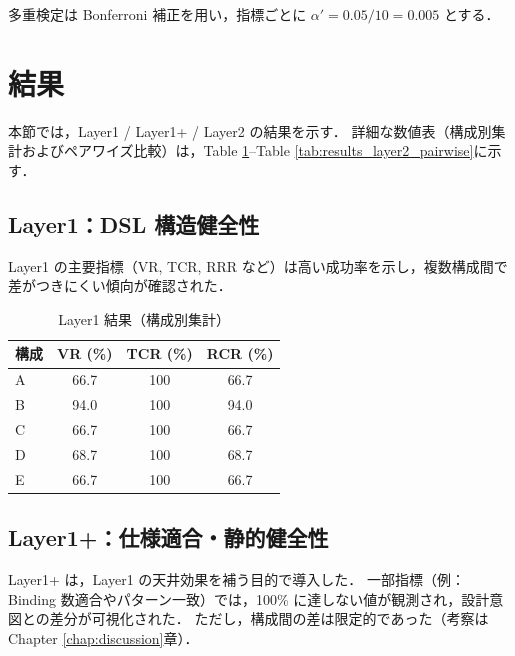 \documentclass[senior,final,11pt,dvipdfmx]{iputit-thesis}
\begin{document}
多重検定は Bonferroni 補正を用い，指標ごとに $\alpha' = 0.05/10 = 0.005$ とする．

\section{結果}
本節では，Layer1 / Layer1+ / Layer2 の結果を示す．
詳細な数値表（構成別集計およびペアワイズ比較）は，Table \ref{tab:results_layer1}--Table \ref{tab:results_layer2_pairwise}に示す．

\subsection{Layer1：DSL 構造健全性}
Layer1 の主要指標（VR, TCR, RRR など）は高い成功率を示し，複数構成間で差がつきにくい傾向が確認された．

\begin{table}[!t]
\centering
\caption{Layer1 結果（構成別集計）}
\label{tab:results_layer1}
\small
\begin{tabular}{lccc} \toprule
構成 & VR (\%) & TCR (\%) & RCR (\%) \\ \midrule
A & 66.7 & 100 & 66.7 \\
B & 94.0 & 100 & 94.0 \\
C & 66.7 & 100 & 66.7 \\
D & 68.7 & 100 & 68.7 \\
E & 66.7 & 100 & 66.7 \\
\bottomrule
\end{tabular}
\end{table}

\subsection{Layer1+：仕様適合・静的健全性}
Layer1+ は，Layer1 の天井効果を補う目的で導入した．
一部指標（例：Binding 数適合やパターン一致）では，100\% に達しない値が観測され，設計意図との差分が可視化された．
ただし，構成間の差は限定的であった（考察はChapter \ref{chap:discussion}章）．
\end{document}

